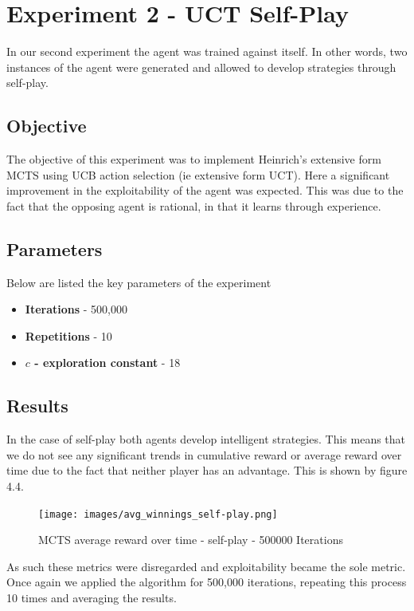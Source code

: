 \section{Experiment 2 - UCT Self-Play} \label{sec:experiment2}
In our second experiment the agent was trained against itself.
In other words, two instances of the agent were generated and allowed to develop strategies
through self-play.

\subsection{Objective}\label{subsec:objective2}
The objective of this experiment was to implement Heinrich's extensive form MCTS using UCB action
selection (ie extensive form UCT).
Here a significant improvement in the exploitability of the agent was expected.
This was due to the fact that the opposing agent is rational, in that it learns
through experience.


\subsection{Parameters}\label{subsec:algAndCoding2}
Below are listed the key parameters of the experiment
\begin{itemize}
    \item \textbf{Iterations} - 500,000
    \item \textbf{Repetitions} - 10
    \item \textbf{$c$ - exploration constant} - 18
\end{itemize}

\subsection{Results}\label{subsec:results2}
In the case of self-play both agents develop intelligent strategies.
This means that we do not see any significant trends in cumulative reward or average reward over time
due to the fact that neither player has an advantage.
This is shown by figure 4.4.
\begin{figure}[ht]
    \texttt{[image: images/avg\_winnings\_self-play.png]}
    \caption{MCTS average reward over time - self-play - 500000 Iterations}
\end{figure}
As such these metrics were disregarded and exploitability became the sole metric.
Once again we applied the algorithm for 500,000 iterations, repeating this process 10 times
and averaging the results.

